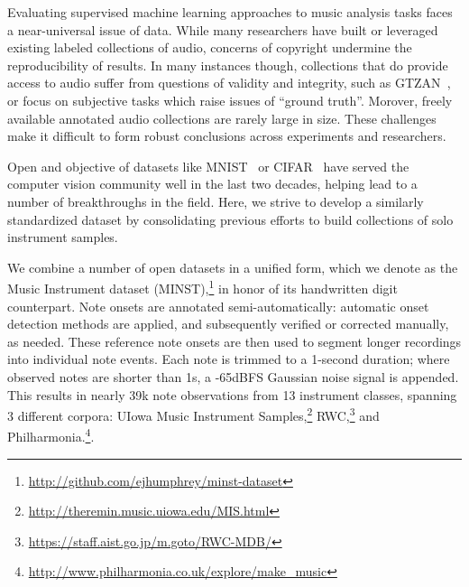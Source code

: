 \documentclass{article}
\begin{document}
Evaluating supervised machine learning approaches to music analysis tasks faces a near-universal issue of data.
While many researchers have built or leveraged existing labeled collections of audio, concerns of copyright undermine the reproducibility of results.
In many instances though, collections that do provide access to audio suffer from questions of validity and integrity, such as GTZAN~\cite{tzanetakis2002musical,sturm2012analysis}, or focus on subjective tasks which raise issues of ``ground truth''.
Morover, freely available annotated audio collections are rarely large in size.
These challenges make it difficult to form robust conclusions across experiments and researchers.

Open and objective of datasets like MNIST~\cite{lecun1998mnist} or CIFAR~\cite{krizhevsky2009learning} have served the computer vision community well in the last two decades, helping lead to a number of breakthroughs in the field.
Here, we strive to develop a similarly standardized dataset by consolidating previous efforts to build collections of solo instrument samples.

We combine a number of open datasets in a unified form, which we denote as the Music Instrument dataset (MINST),\footnote{\url{http://github.com/ejhumphrey/minst-dataset}} in honor of its handwritten digit counterpart.
Note onsets are annotated semi-automatically:
automatic onset detection methods are applied, and subsequently verified or corrected manually, as needed.
These reference note onsets are then used to segment longer recordings into individual note events.
Each note is trimmed to a 1-second duration; where observed notes are shorter than 1s, a -65dBFS Gaussian noise signal is appended.
This results in nearly 39k note observations from 13 instrument classes, spanning 3 different corpora:
UIowa Music Instrument Samples,\footnote{\url{http://theremin.music.uiowa.edu/MIS.html}} RWC,\footnote{\url{https://staff.aist.go.jp/m.goto/RWC-MDB/}} and Philharmonia.\footnote{\url{http://www.philharmonia.co.uk/explore/make\_music}}.
% 
\end{document}
